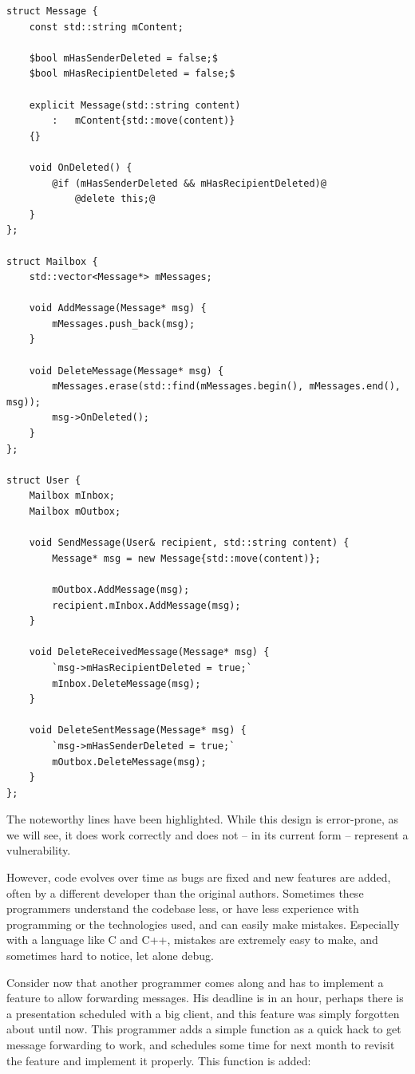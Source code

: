 \begin{lstlisting}
struct Message {
	const std::string mContent;

	$bool mHasSenderDeleted = false;$
	$bool mHasRecipientDeleted = false;$

	explicit Message(std::string content)
		:   mContent{std::move(content)}
	{}

	void OnDeleted() {
		@if (mHasSenderDeleted && mHasRecipientDeleted)@
			@delete this;@
	}
};

struct Mailbox {
	std::vector<Message*> mMessages;

	void AddMessage(Message* msg) {
		mMessages.push_back(msg);
	}

	void DeleteMessage(Message* msg) {
		mMessages.erase(std::find(mMessages.begin(), mMessages.end(), msg));
		msg->OnDeleted();
	}
};

struct User {
	Mailbox mInbox;
	Mailbox mOutbox;

	void SendMessage(User& recipient, std::string content) {
		Message* msg = new Message{std::move(content)};

		mOutbox.AddMessage(msg);
		recipient.mInbox.AddMessage(msg);
	}

	void DeleteReceivedMessage(Message* msg) {
		`msg->mHasRecipientDeleted = true;`
		mInbox.DeleteMessage(msg);
	}

	void DeleteSentMessage(Message* msg) {
		`msg->mHasSenderDeleted = true;`
		mOutbox.DeleteMessage(msg);
	}
};
\end{lstlisting}

The noteworthy lines have been highlighted. While this design is error-prone, as we will see, it does work correctly and does not -- in its current form -- represent a vulnerability.

However, code evolves over time as bugs are fixed and new features are added, often by a different developer than the original authors. Sometimes these programmers understand the codebase less, or have less experience with programming or the technologies used, and can easily make mistakes. Especially with a language like C and C++, mistakes are extremely easy to make, and sometimes hard to notice, let alone debug.

Consider now that another programmer comes along and has to implement a feature to allow forwarding messages. His deadline is in an hour, perhaps there is a presentation scheduled with a big client, and this feature was simply forgotten about until now. This programmer adds a simple function as a quick hack to get message forwarding to work, and schedules some time for next month to revisit the feature and implement it properly. This function is added:

